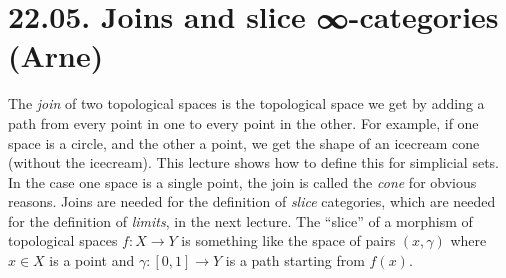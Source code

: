 \documentclass[a4paper]{amsart}
\numberwithin{figure}{section}
\theoremstyle{theorem}
\theoremstyle{definition}
\begin{document}
%
%


\section{22.05. Joins and slice ∞-categories (Arne)}

The \emph{join} of two topological spaces is the topological space we get by adding a path from every point in one to every point in the other. For example, if one space is a circle, and the other a point, we get the shape of an icecream cone (without the icecream). This lecture shows how to define this for simplicial sets. In the case one space is a single point, the join is called the \emph{cone} for obvious reasons. Joins are needed for the definition of \emph{slice} categories, which are needed for the definition of \emph{limits}, in the next lecture. The ``slice'' of a morphism of topological spaces $f: X \to Y$ is something like the space of pairs $(x, \gamma)$ where $x \in X$ is a point and $\gamma: [0, 1] \to Y$ is a path starting from $f(x)$.
\end{document}

